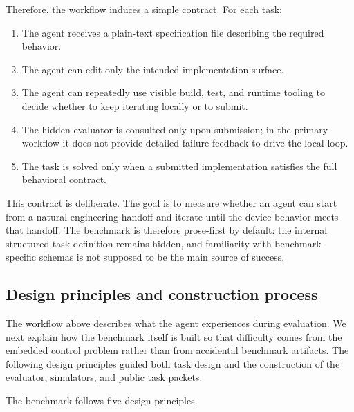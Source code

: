 \documentclass[a4paper,fleqn]{cas-dc}
\begin{document}
Therefore, the workflow induces a simple contract. For each task:

\begin{enumerate}
    \item The agent receives a plain-text specification file describing the required behavior.
    \item The agent can edit only the intended implementation surface.
    \item The agent can repeatedly use visible build, test, and runtime tooling to decide whether to keep iterating locally or to submit.
    \item The hidden evaluator is consulted only upon submission; in the primary workflow it does not provide detailed failure feedback to drive the local loop.
    \item The task is solved only when a submitted implementation satisfies the full behavioral contract.
\end{enumerate}

This contract is deliberate. The goal is to measure whether an agent can start from a natural engineering handoff and iterate until the device behavior meets that handoff. The benchmark is therefore prose-first by default: the internal structured task definition remains hidden, and familiarity with benchmark-specific schemas is not supposed to be the main source of success.


\subsection{Design principles and construction process}

The workflow above describes what the agent experiences during evaluation. We next explain how the benchmark itself is built so that difficulty comes from the embedded control problem rather than from accidental benchmark artifacts. The following design principles guided both task design and the construction of the evaluator, simulators, and public task packets.

The benchmark follows five design principles.
\end{document}
